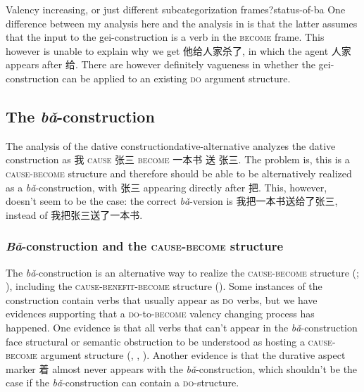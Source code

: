 \documentclass[UTF8, a4paper, oneside, scheme=plain, 12pt]{ctexrep}
\newcommand*{\citepage}[1]{p.~{#1}}
\newcommand*{\citepages}[1]{pp.~{#1}}
\newcommand{\form}[1]{\emph{#1}}
\newcommand*{\category}[1]{\textsc{#1}}
\begin{document}
\begin{infobox}{Valency increasing, or just different subcategorization frames?}{status-of-ba}
    One difference between my analysis here and the analysis in \citet[\citepage{202}]{deng2010formal}
    is that the latter assumes that the input to the gei-construction 
    is a verb in the \category{become} frame.
    This however is unable to explain why we get 他给人家杀了,
    in which the agent 人家 appears after 给.
    There are however definitely vagueness in whether 
    the gei-construction can be applied to an existing \category{do} argument structure.
\end{infobox}


\subsection{The \form{bǎ}-construction}\label{sec:verb-phrase.object.ba}

\begin{infobox}{The analysis of the dative construction}{dative-alternative}
    \citet[\citepage{112}]{deng2010formal} analyzes the dative construction 
    as 我 \category{cause} 张三 \category{become} 一本书 送 张三.
    The problem is, this is a \category{cause}-\category{become} structure 
    and therefore should be able to be alternatively 
    realized as a \form{bǎ}-construction,
    with 张三 appearing directly after 把.
    This, however, doesn't seem to be the case: 
    the correct \form{bǎ}-version is 我把一本书送给了张三,
    instead of 我把张三送了一本书.
\end{infobox}

\subsubsection{\form{Bǎ}-construction and the \category{cause}-\category{become} structure}
\label{sec:verb-phrase.object.ba.cause-become}

The \form{bǎ}-construction
is an alternative way to realize 
the \category{cause}-\category{become} structure
(;
\citealt[\citepages{98-99}]{deng2010formal}),
including the \category{cause}-\category{benefit}-\category{become} structure
().
Some instances of the construction
contain verbs that usually appear as \category{do} verbs,
but we have evidences supporting 
that a \category{do}-to-\category{become} valency changing process has happened.
One evidence is that
all verbs that can't appear in the \form{bǎ}-construction
face structural or semantic obstruction 
to be understood as hosting a \category{cause}-\category{become} argument structure
(, 
,
).
Another evidence is that
the durative aspect marker 着 almost never appears 
with the \form{bǎ}-construction,
which shouldn't be the case 
if the \form{bǎ}-construction can contain a \category{do}-structure.
\end{document}
